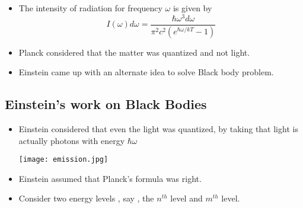 \documentclass[aspectratio=169]{beamer}
\begin{document}
\begin{frame}{}

	\begin{itemize}

		\item The intensity of radiation for frequency $\omega$ is given by \[I(\omega)d\omega = \frac{\hbar \omega^3 d\omega}{ \pi^2 c^2 \left(e^{\hbar \omega / kT}-1 \right) } \] \newline
		\item Planck considered that the matter was quantized and not light. \newline
		\item Einstein came up with an alternate idea to solve Black body problem.
		 
	\end{itemize}
	
\end{frame}


\subsection{Einstein's work on Black Bodies}

\begin{frame}{}

	\begin{itemize}

		\item Einstein considered that even the light was quantized, by taking that light is actually photons with energy $\hbar \omega$   \newline
		\begin{center}	
	
	 		\texttt{[image: emission.jpg]}
	 
		\end{center}

	\end{itemize}
	
\end{frame}

\begin{frame}{}

	\begin{itemize}
	
		\item Einstein assumed that Planck's formula was right. \newline
		\item Consider two energy levels , say , the $n^{th}$ level and $m^{th}$ level. \newline
	\end{itemize}
	
\end{frame}
\end{document}
